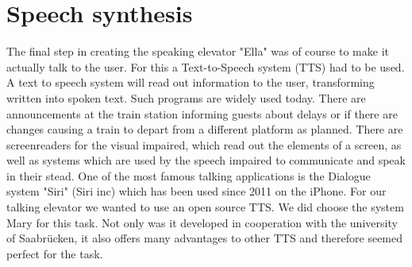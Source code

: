 \documentclass[a4paper, 12pt]{article}
\begin{document}
\newpage        
\section{Speech synthesis}
The final step in creating the speaking elevator "Ella" was of course to make it actually talk to the user.
For this a Text-to-Speech system (TTS) had to be used. A text to speech system will read out information to the user, transforming written into spoken text.
Such programs are widely used today. 
There are announcements at the train station informing guests about delays or if there are changes causing a train to depart from a different platform as planned.
There are screenreaders for the visual impaired, which read out the elements of a screen, as well as systems which are used by the speech impaired to communicate and speak in their stead.
One of the most famous talking applications is the Dialogue system "Siri" (Siri inc) which has been used since 2011 on the iPhone. \newline \newline
For our talking elevator we wanted to use an open source TTS. 
We did choose the system Mary for this task.
Not only was it developed in cooperation with the university of Saabrücken, it also offers many advantages to other TTS and therefore seemed perfect for the task.\newline
\end{document}
